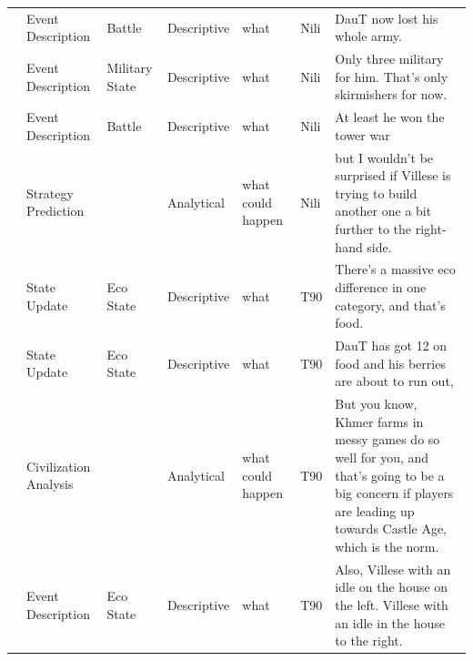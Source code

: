 {\begin{longtable}{@{}>{\theAppRow}r|L{2.3cm}L{2.2cm}L{1.4cm}L{2.2cm}L{0.5cm}U{5.6cm}@{}}
    & Event Description     & Battle               & Descriptive   & what              & Nili    & DauT now lost his whole army.                                                                                                                                                                                            \\
    & Event Description     & Military State       & Descriptive   & what              & Nili    & Only three military for him. That's only skirmishers for now.                                                                                                                                                            \\
    & Event Description     & Battle               & Descriptive   & what              & Nili    & At least he won the tower war                                                                                                                                                                                            \\
    & Strategy Prediction   &                      & Analytical  & what could happen & Nili    & but I wouldn't be surprised if Villese is trying to build another one a bit further to the right-hand side.                                                                                                              \\
    & State Update          & Eco State            & Descriptive   & what              & T90     & There's a massive eco difference in one category, and that's food.                                                                                                                                                       \\
    & State Update          & Eco State            & Descriptive   & what              & T90     & DauT has got 12 on food and his berries are about to run out,                                                                                                                                                            \\
    & Civilization Analysis &                      & Analytical  & what could happen & T90     & But you know, Khmer farms in messy games do so well for you, and that's going to be a big concern if players are leading up towards Castle Age, which is the norm.                                                       \\
    & Event Description     & Eco State            & Descriptive   & what              & T90     & Also, Villese with an idle on the house on the left. Villese with an idle in the house to the right.                                                                                                                     \\

\end{longtable}}
